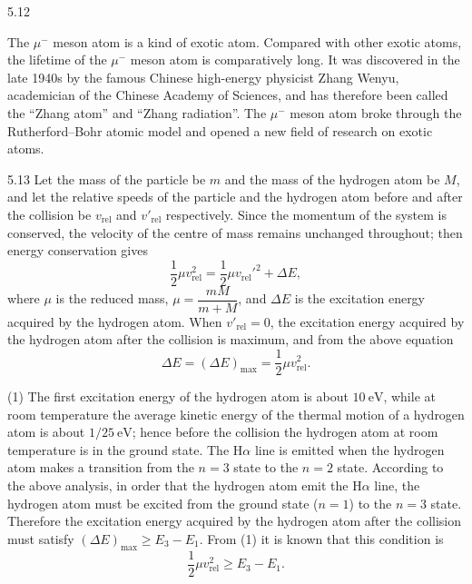 \begin{solution}{5.12}
\begin{commentary}
The $\mu^-$ meson atom is a kind of exotic atom. Compared with other exotic atoms, the lifetime
of the $\mu^-$ meson atom is comparatively long. It was discovered in the late 1940s by the
famous Chinese high-energy physicist Zhang Wenyu, academician of the Chinese Academy of
Sciences, and has therefore been called the ``Zhang atom'' and ``Zhang radiation''. The
$\mu^-$ meson atom broke through the Rutherford--Bohr atomic model and opened a new field of
research on exotic atoms.
\end{commentary}
\end{solution}

\begin{solution}{5.13}
Let the mass of the particle be $m$ and the mass of the hydrogen atom be $M$, and let the
relative speeds of the particle and the hydrogen atom before and after the collision be
$v_{\text{rel}}$ and $v'_{\text{rel}}$ respectively. Since the momentum of the system is
conserved, the velocity of the centre of mass remains unchanged throughout; then energy
conservation gives
\begin{equation*}
\frac{1}{2}\mu v_{\text{rel}}^2=\frac{1}{2}\mu v_{\text{rel}}'^2+\Delta E,
\end{equation*}
where $\mu$ is the reduced mass, $\mu=\dfrac{mM}{m+M}$, and $\Delta E$ is the excitation energy
acquired by the hydrogen atom. When $v'_{\text{rel}}=0$, the excitation energy acquired by the
hydrogen atom after the collision is maximum, and from the above equation
\begin{equation}
\Delta E=(\Delta E)_{\max}=\frac{1}{2}\mu v_{\text{rel}}^2. \tag{1}
\end{equation}

(1) The first excitation energy of the hydrogen atom is about $10\ \mathrm{eV}$, while at room
temperature the average kinetic energy of the thermal motion of a hydrogen atom is about
$1/25\ \mathrm{eV}$; hence before the collision the hydrogen atom at room temperature is in the
ground state. The H$\alpha$ line is emitted when the hydrogen atom makes a transition from the
$n=3$ state to the $n=2$ state. According to the above analysis, in order that the hydrogen atom
emit the H$\alpha$ line, the hydrogen atom must be excited from the ground state ($n=1$) to the
$n=3$ state. Therefore the excitation energy acquired by the hydrogen atom after the collision
must satisfy $(\Delta E)_{\max}\ge E_3-E_1$. From (1) it is known that this condition is
\begin{equation}
\frac{1}{2}\mu v_{\text{rel}}^2\ge E_3-E_1. \tag{2}
\end{equation}


\end{solution}
